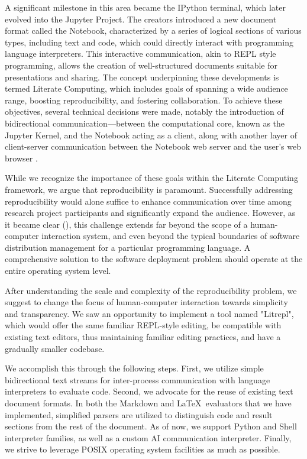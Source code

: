 \documentclass[letterpaper,12pt,twocolumn]{article}
\newcommand{\Latex}{\LaTeX\ }
\begin{document}
A significant milestone in this area became the IPython terminal, which later
evolved into the Jupyter Project. The creators introduced a new document format
called the Notebook, characterized by a series of logical sections of various
types, including text and code, which could directly interact with programming
language interpreters. This interactive communication, akin to REPL style
programming, allows the creation of well-structured documents suitable for
presentations and sharing. The concept underpinning these developments is termed
Literate Computing, which includes goals of spanning a wide audience range,
boosting reproducibility, and fostering collaboration. To achieve these
objectives, several technical decisions were made, notably the introduction of
bidirectional communication—between the computational core, known as the Jupyter
Kernel, and the Notebook acting as a client, along with another layer of
client-server communication between the Notebook web server and the user’s web
browser \textcite{Perez2007IPython, Granger2021litcomp, Kluyver2016jupnb}.

While we recognize the importance of these goals within the Literate Computing
framework, we argue that reproducibility is paramount. Successfully addressing
reproducibility would alone suffice to enhance communication over time among
research project participants and significantly expand the audience.  However,
as it became clear (\textcite{Dolstra2010, Vallet2022}), this challenge extends
far beyond the scope of a human-computer interaction system, and even beyond the
typical boundaries of software distribution management for a particular
programming language. A comprehensive solution to the software deployment
problem should operate at the entire operating system level.

After understanding the scale and complexity of the reproducibility problem, we
suggest to change the focus of human-computer interaction towards simplicity and
transparency. We saw an opportunity to implement a tool named "Litrepl", which
would offer the same familiar REPL-style editing, be compatible with existing
text editors, thus maintaining familiar editing practices, and have a gradually
smaller codebase.

We accomplish this through the following steps. First, we utilize simple
bidirectional text streams for inter-process communication with language
interpreters to evaluate code. Second, we advocate for the reuse of existing
text document formats. In both the Markdown and \Latex evaluators that we have
implemented, simplified parsers are utilized to distinguish code and result
sections from the rest of the document. As of now, we support Python and Shell
interpreter families, as well as a custom AI communication interpreter. Finally,
we strive to leverage POSIX \textcite{POSIX2024} operating system facilities as
much as possible.
\end{document}
